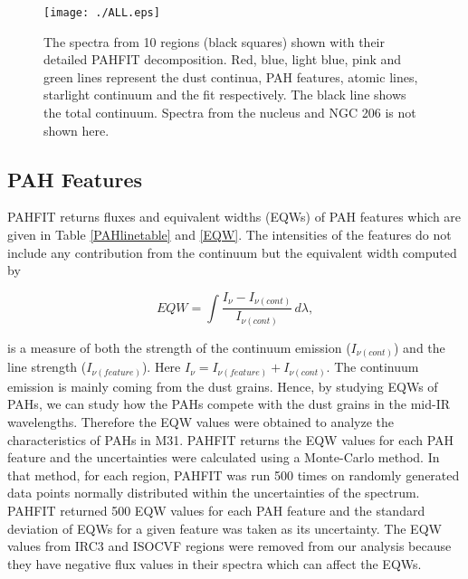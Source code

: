 \begin{figure}
\centering
\texttt{[image: ./ALL.eps]}
  \caption{The spectra from 10 regions (black squares) shown with their detailed PAHFIT decomposition. Red, blue, light blue, pink and green lines represent the dust continua, PAH features, atomic lines, starlight continuum and the fit respectively. The black line shows the total continuum. Spectra from the nucleus and NGC 206 is not shown here.}
\label{PAHFITplots}
\end{figure}


\subsection{PAH Features}

PAHFIT returns fluxes and equivalent widths (EQWs) of PAH features which are given in Table \ref{PAHlinetable} and \ref{EQW}. The intensities of the features do not include any contribution from the continuum but the equivalent width computed by


\begin{equation}
EQW=\int \frac{I_{\nu} - I_{\nu(cont)}}{I_{\nu(cont)}} \,d\lambda,
\end{equation}

is a measure of both the strength of the continuum emission (\(I_{\nu(cont)} \)) and the line strength (\(I_{\nu(feature)}\)). Here \(I_{\nu} = I_{\nu(feature)} + I_{\nu(cont)}\). The continuum emission is mainly coming from the dust grains. Hence, by studying EQWs of PAHs, we can study how the PAHs compete with the dust grains in the mid-IR wavelengths. Therefore the EQW values were obtained to analyze the characteristics of PAHs in M31. PAHFIT returns the EQW values for each PAH feature and the uncertainties were calculated using a Monte-Carlo method. In that method, for each region, PAHFIT was run 500 times on randomly generated data points  normally distributed within the uncertainties of the spectrum. PAHFIT returned 500 EQW values for each PAH feature and the standard deviation of EQWs for a given feature was taken as its uncertainty. 
The EQW values from IRC3 and ISOCVF regions were removed from our analysis because they have negative flux values in their spectra which can affect the EQWs. 



